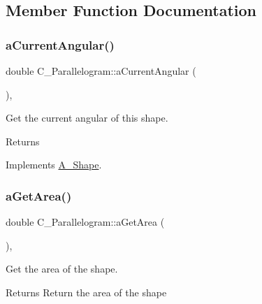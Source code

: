 \subsection{Member Function Documentation}
\mbox{\label{classC__Parallelogram_a51959da2b0cf083767f39d8065f395f2}} 
\subsubsection{\texorpdfstring{a\+Current\+Angular()}{aCurrentAngular()}}
{\footnotesize\ttfamily double C\+\_\+\+Parallelogram\+::a\+Current\+Angular (\begin{DoxyParamCaption}{ }\end{DoxyParamCaption})\hspace{0.3cm}{\ttfamily [override]}, {\ttfamily [virtual]}}



Get the current angular of this shape. 

\begin{DoxyReturn}{Returns}

\end{DoxyReturn}


Implements \hyperlink{classA__Shape_a80fa4e009c875dd0ba7fc5bfeeb43f98}{A\+\_\+\+Shape}.

\mbox{\label{classC__Parallelogram_a72b4509a33ee27331e5b9bdc8a3278e8}} 
\subsubsection{\texorpdfstring{a\+Get\+Area()}{aGetArea()}}
{\footnotesize\ttfamily double C\+\_\+\+Parallelogram\+::a\+Get\+Area (\begin{DoxyParamCaption}{ }\end{DoxyParamCaption})\hspace{0.3cm}{\ttfamily [override]}, {\ttfamily [virtual]}}



Get the area of the shape. 

\begin{DoxyReturn}{Returns}
Return the area of the shape 
\end{DoxyReturn}


